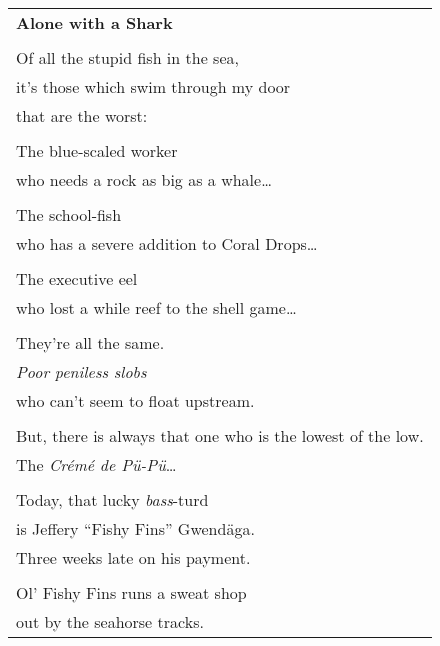 \documentclass{article}
\begin{document}
\newcommand{\h}{\hspace*{2ex}}
\begin{center}
\begin{tabular}{l}
\textbf{Alone with a Shark} \\
\\
Of all the stupid fish in the sea, \\
\h{}it's those which swim through my door \\
that are the worst: \\
\\
\h{}The blue-scaled worker \\
\h\h{}who needs a rock as big as a whale\ldots \\
\\
\h{}The school-fish \\
\h\h{}who has a severe addition to Coral Drops\ldots \\
\\
\h{}The executive eel \\
\h\h{}who lost a while reef to the shell game\ldots \\
\\
They're all the same. \\
\h{}\textit{Poor peniless slobs} \\
who can't seem to float upstream. \\
\\
But, there is always that one who is the lowest of the low. \\
\h{}The \textit{Cr{\'e}m{\'e} de P{\"u}-P{\"u}}\ldots \\
\\
Today, that lucky \textit{bass}-turd \\
\h{}is Jeffery ``Fishy Fins'' Gwend{\"a}ga. \\
Three weeks late on his payment. \\
\\
Ol' Fishy Fins runs a sweat shop \\ %
\h{}out by the seahorse tracks. \\


\end{tabular}
\end{center}
\end{document}
